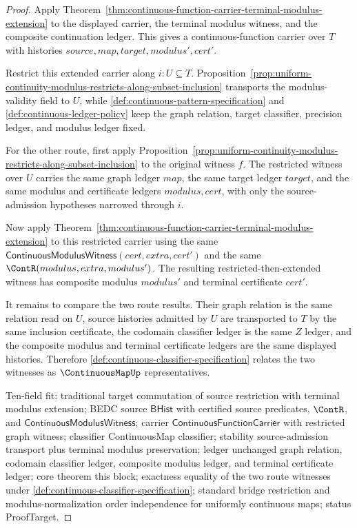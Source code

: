 \begin{proof}
Apply Theorem~\ref{thm:continuous-function-carrier-terminal-modulus-extension} to the displayed carrier, the terminal modulus witness, and the composite continuation ledger. This gives a continuous-function carrier over $T$ with histories $source,map,target,modulus',cert'$.

Restrict this extended carrier along $i:U\subseteq T$. Proposition~\ref{prop:uniform-continuity-modulus-restricts-along-subset-inclusion} transports the modulus-validity field to $U$, while \autoref{def:continuous-pattern-specification} and \autoref{def:continuous-ledger-policy} keep the graph relation, target classifier, precision ledger, and modulus ledger fixed.

For the other route, first apply Proposition~\ref{prop:uniform-continuity-modulus-restricts-along-subset-inclusion} to the original witness $f$. The restricted witness over $U$ carries the same graph ledger $map$, the same target ledger $target$, and the same modulus and certificate ledgers $modulus,cert$, with only the source-admission hypotheses narrowed through $i$.

Now apply Theorem~\ref{thm:continuous-function-carrier-terminal-modulus-extension} to this restricted carrier using the same $\mathsf{ContinuousModulusWitness}(cert,extra,cert')$ and the same $\ContR(modulus,extra,modulus')$. The resulting restricted-then-extended witness has composite modulus $modulus'$ and terminal certificate $cert'$.

It remains to compare the two route results. Their graph relation is the same relation read on $U$, source histories admitted by $U$ are transported to $T$ by the same inclusion certificate, the codomain classifier ledger is the same $Z$ ledger, and the composite modulus and terminal certificate ledgers are the same displayed histories. Therefore \autoref{def:continuous-classifier-specification} relates the two witnesses as $\ContinuousMapUp$ representatives.

Ten-field fit: traditional target commutation of source restriction with terminal modulus extension; BEDC source $\mathsf{BHist}$ with certified source predicates, $\ContR$, and $\mathsf{ContinuousModulusWitness}$; carrier $\mathsf{ContinuousFunctionCarrier}$ with restricted graph witness; classifier ContinuousMap classifier; stability source-admission transport plus terminal modulus preservation; ledger unchanged graph relation, codomain classifier ledger, composite modulus ledger, and terminal certificate ledger; core theorem this block; exactness equality of the two route witnesses under \autoref{def:continuous-classifier-specification}; standard bridge restriction and modulus-normalization order independence for uniformly continuous maps; status ProofTarget.
\end{proof}

